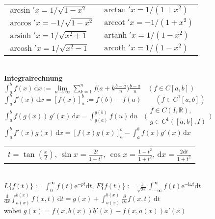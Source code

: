 \documentclass[a4paper,10pt,fleqn,twoside,twocolumn,dvipdfmx]{scrartcl}
\newcommand{\ee}{\mathrm e}
\newcommand{\ui}{\mathrm i}
\newcommand{\R}{\mathbb R}
\newcommand{\strong}[1]{\textsf{\textbf{#1}}}
\newcommand{\ds}{\displaystyle}
\newcommand{\arccot}{\operatorname{arccot}}
\newcommand{\arsinh}{\operatorname{arsinh}}
\newcommand{\arcosh}{\operatorname{arcosh}}
\newcommand{\artanh}{\operatorname{artanh}}
\newcommand{\arcoth}{\operatorname{arcoth}}
\begin{document}
\begin{tabular}{@{}l|l}
$\arcsin'x = 1/\sqrt{1-x^2}$ & $\arctan'x = 1/(1+x^2)$\\
$\arccos'x = -1/\sqrt{1-x^2}$ & $\arccot'x = -1/(1+x^2)$\\ 
$\arsinh'x = 1/\sqrt{x^2+1}$ & $\artanh'x = 1/(1-x^2)$\\
$\arcosh'x = 1/\sqrt{x^2-1}$ & $\arcoth'x = 1/(1-x^2)$
\end{tabular}\\[4pt]
\strong{Integralrechnung}\\
$\int_a^b f(x)\,\mathrm dx
:= \lim\limits_{n\to\infty}\sum_{k=1}^n
f\!\big(a+k\frac{b-a}{n}\big)\frac{b-a}{n}\quad (f\in C[a,b])$\\
$\int_a^b f'(x)\,\mathrm dx = [f(x)]_a^b := f(b)-f(a)\qquad (f\in C^1[a,b])$\\
$\int_a^b f(g(x))\,g'(x)\,\mathrm dx = \int_{g(a)}^{g(b)} f(u)\,\mathrm du\quad
\Big(\begin{smallmatrix}f\in C(I,\R),\\ g\in C^1([a,b],I)\end{smallmatrix}\Big)$\\
$\int_a^b\! f'(x)g(x)\,\mathrm dx = [f(x)g(x)]_a^b-\int_a^b\! f(x)g'(x)\,\mathrm dx$%
\;\\
\begin{tabular}{@{}l}
$t=\tan(\frac{x}{2})$,\; $\sin x = \frac{2t}{1+t^2}$,\;
$\cos x = \frac{1-t^2}{1+t^2}$,\; $\mathrm dx = \frac{2\mathrm dt}{1+t^2}$
\end{tabular}\\
$L\{f(t)\} := \int_0^{\infty}\! f(t)\ee^{-pt}\mathrm dt$,\;
$F\{f(t)\} := \frac{1}{\sqrt{2\pi}}\int_{-\infty}^{\infty}
f(t)\ee^{-\ui\omega t}\mathrm dt$\\
$\ds\frac{\mathrm d}{\mathrm dx}\int_{a(x)}^{b(x)} f(x,t)\,\mathrm dt
= g(x) + \int_{a(x)}^{b(x)} \frac{\partial}{\partial x}f(x,t)\,\mathrm dt$\\
wobei $g(x) = f(x,b(x))b'(x) - f(x,a(x))a'(x)$
\end{document}
